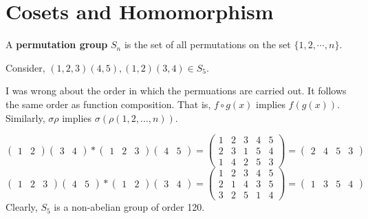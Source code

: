 \section{Cosets and Homomorphism}

\begin{definition}
	A \textbf{permutation group} $S_n$ is the set of all permutations on the set $\{1,2,\cdots,n\}$.	
\end{definition}

\begin{remark}
	Consider, $(1,2,3)(4,5), (1,2)(3,4) \in S_5$.
	\begin{commentary}
		I was wrong about the order in which the permuations are carried out. It follows the same order as function composition. That is, $f \circ g(x)$ implies $f(g(x))$. Similarly, $\sigma\rho$ implies $\sigma(\rho(1,2,\dots,n))$.
	\end{commentary}
	$$\begin{pmatrix} 1 & 2 \end{pmatrix} \begin{pmatrix} 3 & 4 \end{pmatrix} \ast \begin{pmatrix} 1 & 2 & 3 \end{pmatrix} \begin{pmatrix} 4 & 5 \end{pmatrix} =  \begin{pmatrix} 1 & 2 & 3 & 4 & 5 \\ 2 & 3 & 1 & 5 & 4 \\ 1 & 4 & 2 & 5 & 3 \end{pmatrix}  = \begin{pmatrix} 2 & 4 & 5 & 3 \end{pmatrix} $$
		$$\begin{pmatrix} 1 & 2 & 3 \end{pmatrix} \begin{pmatrix} 4 & 5 \end{pmatrix} \ast \begin{pmatrix} 1 & 2 \end{pmatrix} \begin{pmatrix} 3 & 4 \end{pmatrix} =  \begin{pmatrix} 1 & 2 & 3 & 4 & 5 \\ 2 & 1 & 4 & 3 & 5 \\ 3 & 2 & 5 & 1 & 4 \end{pmatrix}  = \begin{pmatrix} 1 & 3 & 5 & 4 \end{pmatrix} $$
	Clearly, $S_5$ is a non-abelian group of order 120.
\end{remark}

